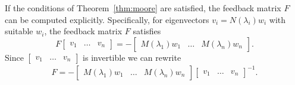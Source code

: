 \documentclass[11pt]{article}
\theoremstyle{plain}
\theoremstyle{definition}
\theoremstyle{remark}
\begin{document}
If the conditions of Theorem~\ref{thm:moore} are satisfied, the feedback matrix $F$ can be computed explicitly. Specifically, for eigenvectors $v_i = N(\lambda_i) w_i$ with suitable $w_i$, the feedback matrix $F$ satisfies
\begin{equation}
    \label{eq:F}
    F\begin{bmatrix}
        v_1 & \dots & v_n
    \end{bmatrix} = -\begin{bmatrix}
        M(\lambda_1)w_1 & \dots & M(\lambda_n)w_n
        \end{bmatrix}.
\end{equation}
Since $\begin{bmatrix}
        v_1 & \dots & v_n
    \end{bmatrix}$ is invertible we can rewrite
\begin{align}
\label{eq:F_explicit_with_inverse}
F=-\begin{bmatrix}
        M(\lambda_1)w_1 &\!\! \dots &\!\! M(\lambda_n)w_n
        \end{bmatrix}\begin{bmatrix}
        v_1 &\!\! \dots &\!\! v_n
    \end{bmatrix}^{-1}.
\end{align}
\end{document}
